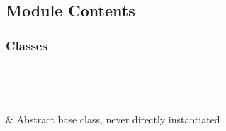 \documentclass[letterpaper,10pt,english]{sphinxmanual}
\begin{document}
\subsection{Module Contents}
\label{\detokenize{autoapi/Integrator/index:module-contents}}

\subsubsection{Classes}
\label{\detokenize{autoapi/Integrator/index:classes}}

\begin{savenotes}\sphinxatlongtablestart\begin{longtable}[c]{}
\hline

\endfirsthead

%
{}\\
\hline

\endhead

\hline
{}\\
\endfoot

\endlastfoot

\sphinxAtStartPar
{\hyperref[\detokenize{autoapi/Integrator/index:Integrator.Integrator}]{}}
&
\sphinxAtStartPar
Abstract base class, never directly instantiated
\\
\hline
\end{longtable}\sphinxatlongtableend\end{savenotes}
\end{document}
